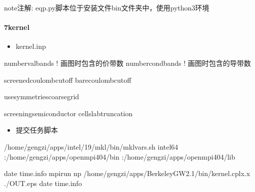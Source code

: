 \documentclass[a4paper,12pt,english]{sphinxmanual}
\begin{document}
\begin{sphinxadmonition}{note}{注解:}
\sphinxAtStartPar
eqp.py脚本位于安装文件bin文件夹中，使用python3环境
\end{sphinxadmonition}


\paragraph{7\sphinxhyphen{}kernel}
\label{\detokenize{tutorials/berkeleygw/gw:kernel}}\begin{itemize}
\item {} 
\sphinxAtStartPar
kernel.inp

\end{itemize}

\begin{sphinxVerbatim}[commandchars=\\\{\}]
number\PYGZus{}val\PYGZus{}bands   ! 画图时包含的价带数
number\PYGZus{}cond\PYGZus{}bands  ! 画图时包含的导带数

screened\PYGZus{}coulomb\PYGZus{}cutoff 
bare\PYGZus{}coulomb\PYGZus{}cutoff  

use\PYGZus{}symmetries\PYGZus{}coarse\PYGZus{}grid

screening\PYGZus{}semiconductor
cell\PYGZus{}slab\PYGZus{}truncation
\end{sphinxVerbatim}
\begin{itemize}
\item {} 
\sphinxAtStartPar
提交任务脚本

\end{itemize}

\begin{sphinxVerbatim}[commandchars=\\\{\}]

 
 /home/gengzi/apps/intel/19/mkl/bin/mklvars.sh intel64
 :/home/gengzi/apps/openmpi404/bin
 :/home/gengzi/apps/openmpi404/lib

date  \PYGZgt{}\PYGZgt{} time.info
mpirun \PYGZhy{}np  /home/gengzi/apps/BerkeleyGW\PYGZhy{}2.1/bin/kernel.cplx.x \PYGZgt{} ./OUT.eps
date  \PYGZgt{}\PYGZgt{} time.info
\end{sphinxVerbatim}
\end{document}
